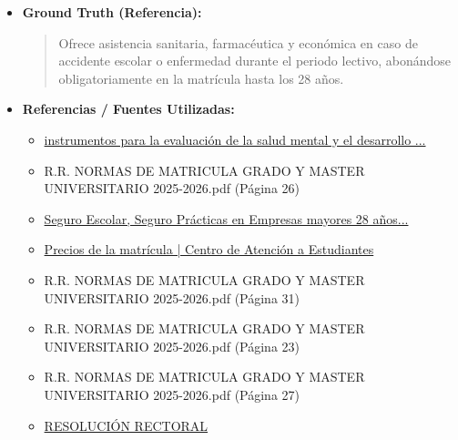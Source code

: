 \documentclass[12pt,a4paper,oneside]{report}
\begin{document}
\begin{itemize}
\begin{itemize}
\begin{quote}
Por lo tanto, el seguro escolar obligatorio para estudiantes menores de 28 años en la Universidad de Sevilla es una requisito que deben cumplir todos los estudiantes que se matriculen y cumplan con los requisitos establecidos.
                \end{quote}
          \item \textbf{{Ground Truth (Referencia):}} \\
                \begin{quote}
Ofrece asistencia sanitaria, farmacéutica y económica en caso de accidente escolar o enfermedad durante el periodo lectivo, abonándose obligatoriamente en la matrícula hasta los 28 años.
                \end{quote}
          \item \textbf{{Referencias / Fuentes Utilizadas:}} \\
                \begin{itemize}
                  \item \href{https://idus.us.es/bitstreams/2f971a3e-a409-4132-b9cb-100fd37a1cb2/download}{instrumentos para la evaluación de la salud mental y el desarrollo ...}
                  \item R.R. NORMAS DE MATRICULA GRADO Y MASTER UNIVERSITARIO 2025-2026.pdf (Página 26)
                  \item \href{https://fceye.us.es/seguro-escolar-seguro-practicas-en-empresas-mayores-28-anos-y-seguro-de-estudiantes-de-movilidad}{Seguro Escolar, Seguro Prácticas en Empresas mayores 28 años...}
                  \item \href{https://cat.us.es/matricula/precios-de-la-matricula}{Precios de la matrícula | Centro de Atención a Estudiantes}
                  \item R.R. NORMAS DE MATRICULA GRADO Y MASTER UNIVERSITARIO 2025-2026.pdf (Página 31)
                  \item R.R. NORMAS DE MATRICULA GRADO Y MASTER UNIVERSITARIO 2025-2026.pdf (Página 23)
                  \item R.R. NORMAS DE MATRICULA GRADO Y MASTER UNIVERSITARIO 2025-2026.pdf (Página 27)
                  \item \href{https://www.us.es/sites/default/files/inline-files/NORMAS-MATRICULA-Grado-Máster-21-22.pdf}{RESOLUCIÓN RECTORAL}
                \end{itemize}
        \end{itemize}


\end{itemize}
\end{document}
